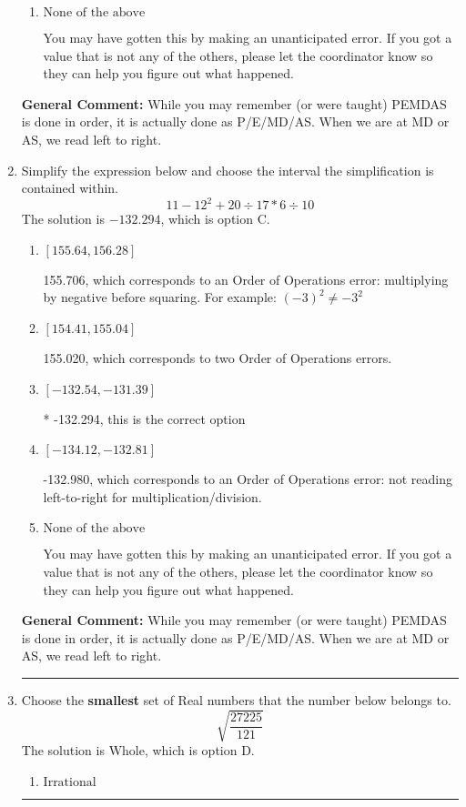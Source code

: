 \documentclass{extbook}[14pt]
\newcommand{\litem}[1]{\item #1

\rule{\textwidth}{0.4pt}}
\begin{document}
\begin{enumerate}
{\begin{enumerate}[label=\Alph*.]
 334.901, which corresponds to an Order of Operations error: multiplying by negative before squaring. For example: $(-3)^2 \neq -3^2$
\item \( \text{None of the above} \)

 You may have gotten this by making an unanticipated error. If you got a value that is not any of the others, please let the coordinator know so they can help you figure out what happened.
\end{enumerate}

\textbf{General Comment:} While you may remember (or were taught) PEMDAS is done in order, it is actually done as P/E/MD/AS. When we are at MD or AS, we read left to right.
}
\litem{
Simplify the expression below and choose the interval the simplification is contained within.
\[ 11 - 12^2 + 20 \div 17 * 6 \div 10 \]
The solution is \( -132.294 \), which is option C.\begin{enumerate}[label=\Alph*.]
\item \( [155.64, 156.28] \)

 155.706, which corresponds to an Order of Operations error: multiplying by negative before squaring. For example: $(-3)^2 \neq -3^2$
\item \( [154.41, 155.04] \)

 155.020, which corresponds to two Order of Operations errors.
\item \( [-132.54, -131.39] \)

* -132.294, this is the correct option
\item \( [-134.12, -132.81] \)

 -132.980, which corresponds to an Order of Operations error: not reading left-to-right for multiplication/division.
\item \( \text{None of the above} \)

 You may have gotten this by making an unanticipated error. If you got a value that is not any of the others, please let the coordinator know so they can help you figure out what happened.
\end{enumerate}

\textbf{General Comment:} While you may remember (or were taught) PEMDAS is done in order, it is actually done as P/E/MD/AS. When we are at MD or AS, we read left to right.
}
\litem{
Choose the \textbf{smallest} set of Real numbers that the number below belongs to.
\[ \sqrt{\frac{27225}{121}} \]
The solution is \( \text{Whole} \), which is option D.\begin{enumerate}[label=\Alph*.]
\item \( \text{Irrational} \)


\end{enumerate}}
\end{enumerate}
\end{document}
